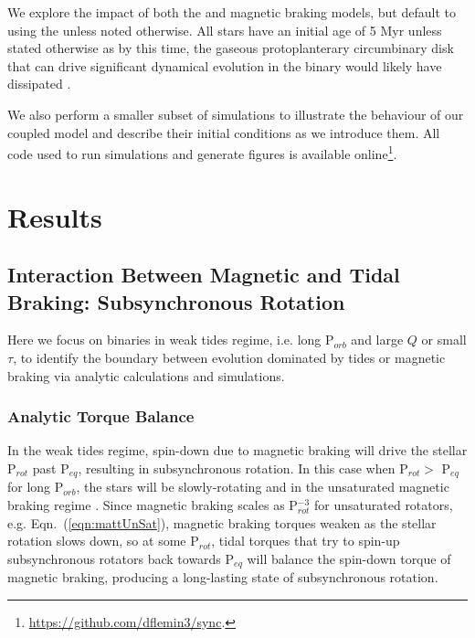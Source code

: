 \documentclass[twocolumn]{aastex61}
\begin{document}
We explore the impact of both the \citet{Matt2015} and \citet{Reiners2012} magnetic braking models, but default to using the \citet{Matt2015} unless noted otherwise. All stars have an initial age of 5 Myr unless stated otherwise as by this time, the gaseous protoplanterary circumbinary disk that can drive significant dynamical evolution in the binary \citep[e.g.][]{Fleming2017} would likely have dissipated \citep{Haisch2001}.

We also perform a smaller subset of simulations to illustrate the behaviour of our coupled model and describe their initial conditions as we introduce them. All code used to run simulations and generate figures is available online\footnote{\href{https://github.com/dflemin3/sync}{https://github.com/dflemin3/sync}.}.


\section{Results} \label{sec:results}

\subsection{Interaction Between Magnetic and Tidal Braking: Subsynchronous Rotation} \label{sec:eq}

Here we focus on binaries in weak tides regime, i.e. long P$_{orb}$ and large $Q$ or small $\tau$, to identify the boundary between evolution dominated by tides or magnetic braking via analytic calculations and simulations.  

\subsubsection{Analytic Torque Balance} \label{sec:analytic}

In the weak tides regime, spin-down due to magnetic braking will drive the stellar P$_{rot}$ past P$_{eq}$, resulting in subsynchronous rotation. In this case when P$_{rot} >$ P$_{eq}$ for long P$_{orb}$, the stars will be slowly-rotating and in the unsaturated magnetic braking regime \citep{Matt2015}. Since magnetic braking scales as P$_{rot}^{-3}$ for unsaturated rotators, e.g. Eqn.~(\ref{eqn:mattUnSat}), magnetic braking torques weaken as the stellar rotation slows down, so at some P$_{rot}$, tidal torques that try to spin-up subsynchronous rotators back towards P$_{eq}$ will balance the spin-down torque of magnetic braking, producing a long-lasting state of subsynchronous rotation. 
\end{document}
